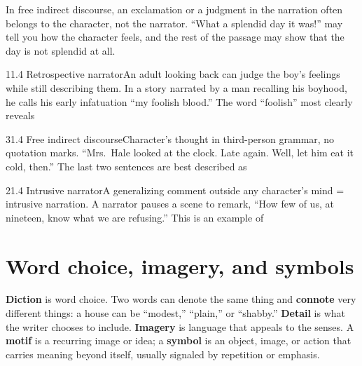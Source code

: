 \documentclass[11pt]{article}
\begin{document}
\begin{trap}
In free indirect discourse, an exclamation or a judgment in the narration often belongs to the character, not the narrator. ``What a splendid day it was!'' may tell you how the character feels, and the rest of the passage may show that the day is not splendid at all.
\end{trap}

\begin{q}{1}{1.4 Retrospective narrator}{An adult looking back can judge the boy's feelings while still describing them.}
In a story narrated by a man recalling his boyhood, he calls his early infatuation ``my foolish blood.'' The word ``foolish'' most clearly reveals
\end{q}

\begin{q}{3}{1.4 Free indirect discourse}{Character's thought in third-person grammar, no quotation marks.}
``Mrs.\ Hale looked at the clock. Late again. Well, let him eat it cold, then.'' The last two sentences are best described as
\end{q}

\begin{q}{2}{1.4 Intrusive narrator}{A generalizing comment outside any character's mind = intrusive narration.}
A narrator pauses a scene to remark, ``How few of us, at nineteen, know what we are refusing.'' This is an example of
\end{q}

\section{Word choice, imagery, and symbols}
\label{sec:5}

\textbf{Diction} is word choice. Two words can denote the same thing and \textbf{connote} very different things: a house can be ``modest,'' ``plain,'' or ``shabby.'' \textbf{Detail} is what the writer chooses to include. \textbf{Imagery} is language that appeals to the senses. A \textbf{motif} is a recurring image or idea; a \textbf{symbol} is an object, image, or action that carries meaning beyond itself, usually signaled by repetition or emphasis.
\end{document}
